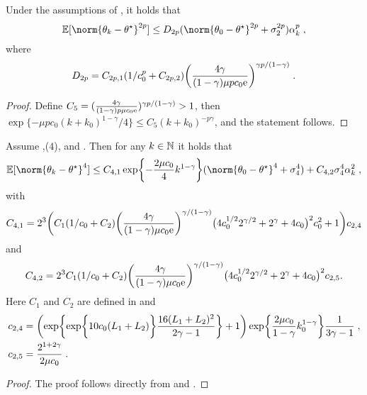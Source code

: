 \begin{corollary}
\label{cor:p_moment_bound}
Under the assumptions of ,  it holds that 
\begin{equation}
\PE[\norm{\theta_k-\thetas}^{2p}]\leq D_{2p} (\norm{\theta_0-\thetas}^{2p} + \sigma_2^{2p}) \alpha_k^p\eqsp,
\end{equation}
where 
\[
D_{2p} = C_{2p,1} (1/c_0^p + C_{2p, 2}) \biggl(\frac{4\gamma}{(1-\gamma)\mu p c_0 \mathrm{e}}\biggr)^{\gamma p/(1-\gamma)}\;.
\]
\end{corollary}
\begin{proof}
Define $C_5 = (\frac{4\gamma}{(1-\gamma)p\mu c_0 \mathrm{e}})^{\gamma p/(1-\gamma)} > 1$, then  $\exp\{-\mu pc_0(k+k_0)^{1-\gamma} / 4\}\leq C_5 (k+k_0)^{-p\gamma}$, and the statement follows.
\end{proof}


\begin{corollary}
\label{cor:fourth_moment_bound_last_iterate}
Assume ,($4$),  and . Then for any $k \in \mathbb{N}$ it holds that
\begin{equation}
\PE[\norm{\theta_k - \thetas}^{4}] \leq C_{4,1}\exp\biggl\{-\frac{2\mu c_0}{4}k^{1-\gamma}\biggr\}(\norm{\theta_0-\thetas}^{4} + \sigma_{4}^{4}) + C_{4,2}\sigma_{4}^{4}\alpha_k^2\eqsp, 
\end{equation}
with 
\begin{equation}
    C_{4,1} = 2^{3}\biggl(C_1(1/c_0+C_2)\biggl(\frac{4\gamma}{(1-\gamma)\mu c_0 \mathrm{e}}\biggr)^{\gamma/(1-\gamma)}\bigl(4c_0^{1/2}2^{\gamma/2}+2^{\gamma}+ 4c_0\bigr)^2c_0^2+1\biggr)c_{2,4}
\end{equation}
and 
\begin{equation}
    C_{4,2} =2^{3}C_1(1/c_0+C_2)\biggl(\frac{4\gamma}{(1-\gamma)\mu c_0 \mathrm{e}}\biggr)^{\gamma/(1-\gamma)}\bigl(4c_0^{1/2}2^{\gamma/2}+2^{\gamma}+ 4c_0\bigr)^2c_{2,5}.
\end{equation}
Here $C_1$ and $C_2$ are defined in  and 
\begin{align}
    &c_{2,4} = \biggl(\exp\biggl\{\exp\biggl\{10c_0(L_1+L_2)\biggr\}\frac{16(L_1+L_2)^2}{2\gamma-1}\biggr\} + 1\biggr)\exp\biggl\{\frac{2\mu c_0}{1-\gamma}k_0^{1-\gamma}\biggr\}\frac{1}{3\gamma-1}\;, \\&
    c_{2,5} = \frac{2^{1+2\gamma}}{2\mu c_0}\;.
\end{align}
\end{corollary}
\begin{proof}
The proof follows directly from  and .
\end{proof}



% 
